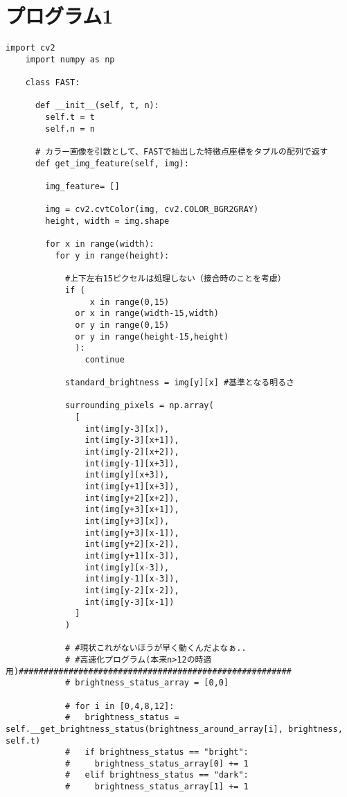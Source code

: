 \section{プログラム1}
\begin{lstlisting}[caption=FAST]
    import cv2
    import numpy as np
    
    class FAST:
    
      def __init__(self, t, n):
        self.t = t
        self.n = n 
    
      # カラー画像を引数として、FASTで抽出した特徴点座標をタプルの配列で返す
      def get_img_feature(self, img):
    
        img_feature= []
    
        img = cv2.cvtColor(img, cv2.COLOR_BGR2GRAY)
        height, width = img.shape
    
        for x in range(width):
          for y in range(height):
    
            #上下左右15ピクセルは処理しない（接合時のことを考慮）
            if (
                 x in range(0,15) 
              or x in range(width-15,width) 
              or y in range(0,15) 
              or y in range(height-15,height)
              ):
                continue
    
            standard_brightness = img[y][x] #基準となる明るさ
    
            surrounding_pixels = np.array(
              [
                int(img[y-3][x]),
                int(img[y-3][x+1]),
                int(img[y-2][x+2]),
                int(img[y-1][x+3]),
                int(img[y][x+3]),
                int(img[y+1][x+3]),
                int(img[y+2][x+2]),
                int(img[y+3][x+1]),
                int(img[y+3][x]),
                int(img[y+3][x-1]),
                int(img[y+2][x-2]),
                int(img[y+1][x-3]),
                int(img[y][x-3]),
                int(img[y-1][x-3]),
                int(img[y-2][x-2]),
                int(img[y-3][x-1])
              ]
            )
    
            # #現状これがないほうが早く動くんだよなぁ..
            # #高速化プログラム(本来n>12の時適用)#######################################################
            # brightness_status_array = [0,0]
    
            # for i in [0,4,8,12]:
            #   brightness_status = self.__get_brightness_status(brightness_around_array[i], brightness, self.t)
            #   if brightness_status == "bright":
            #     brightness_status_array[0] += 1 
            #   elif brightness_status == "dark":
            #     brightness_status_array[1] += 1
    

\end{lstlisting}
